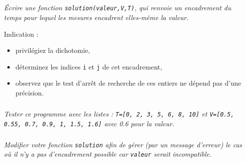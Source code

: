 \documentclass[10pt,oneside]{article}
\begin{document}
\subparagraph{}\textit{Écrire une fonction \texttt{solution(valeur,V,T)}, qui renvoie un
encadrement du temps pour lequel les mesures encadrent elles-même la valeur.}

Indication :
\begin{itemize}
\item privilégiez la dichotomie,
\item déterminez les indices \texttt{i} et \texttt{j} de cet encadrement,
\item observez que le test d'arrêt de recherche de ces entiers ne dépend pas d'une précision.
\end{itemize}

\subparagraph{}\textit{Tester ce programme avec les listes : \texttt{T=[0, 2, 3, 5, 6, 8, 10]} et \texttt{V=[0.5, 0.55, 0.7, 0.9, 1, 1.5, 1.6]} avec 0.6  pour la valeur.}

\subparagraph{}\textit{Modifier votre fonction \texttt{solution} afin de gérer (par un message d'erreur) le cas où il n'y a pas d'encadrement possible car \texttt{valeur} serait incompatible.}
\end{document}
